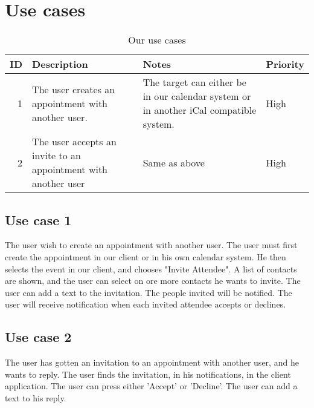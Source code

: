 \section{Use cases}
\begin{table*}[ht]\centering
  \begin{tabularx}{\textwidth}{@{}rXXl@{}}\toprule
    \textbf{ID} & \textbf{Description} & \textbf{Notes} & \textbf{Priority} \\\hline
    1 & The user creates an appointment with another user.             & The
    target can either be in our calendar system or in another iCal compatible
    system. & High \\\hline
    2 & The user accepts an invite to an appointment with another user & Same
    as above
    & High \\
    \bottomrule
  \end{tabularx}
  \caption{Our use cases}
  \label{usecases}\centering%
\end{table*}
\subsection{Use case 1}
The user wish to create an appointment with another user. The user must first create the appointment in our client or in his own calendar system. He then selects the event in our client, and chooses "Invite Attendee". A list of contacts are shown, and the user can select on ore more contacts he wants to invite. The user can add a text to the invitation. The people invited will be notified. The user will receive notification when each invited attendee accepts or declines.
\subsection{Use case 2}
The user has gotten an invitation to an appointment with another user, and he wants to reply.
The user finds the invitation, in his notifications, in the client application. The user can press either 'Accept' or 'Decline'. The user can add a text to his reply.
\newpage

